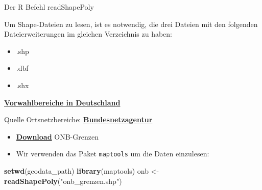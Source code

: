 \documentclass[ignorenonframetext,]{beamer}
\newenvironment{Shaded}{\begin{snugshade}}{\end{snugshade}}
\newcommand{\KeywordTok}[1]{\textcolor[rgb]{0.13,0.29,0.53}{\textbf{#1}}}
\newcommand{\NormalTok}[1]{#1}
\newcommand{\StringTok}[1]{\textcolor[rgb]{0.31,0.60,0.02}{#1}}
\providecommand{\tightlist}{%
  \setlength{\itemsep}{0pt}\setlength{\parskip}{0pt}}
\begin{document}
\begin{frame}{Der R Befehl readShapePoly}
\protect\hypertarget{der-r-befehl-readshapepoly}{}

Um Shape-Dateien zu lesen, ist es notwendig, die drei Dateien mit den
folgenden Dateierweiterungen im gleichen Verzeichnis zu haben:

\begin{itemize}
\tightlist
\item
  .shp
\item
  .dbf
\item
  .shx
\end{itemize}

\end{frame}

\begin{frame}[fragile]{\href{http://www.bundesnetzagentur.de/SharedDocs/Downloads/DE/Sachgebiete/Telekommunikation/Unternehmen_Institutionen/Nummerierung/Rufnummern/ONVerzeichnisse/ONBGrenzen/ONB_Grenzen.html}{\textbf{Vorwahlbereiche
in Deutschland}}}
\protect\hypertarget{vorwahlbereiche-in-deutschland}{}

\begin{block}{Quelle Ortsnetzbereiche:
\href{https://www.bundesnetzagentur.de/DE/Sachgebiete/Telekommunikation/Unternehmen_Institutionen/Nummerierung/Rufnummern/ONRufnr/ON_Einteilung_ONB/ON_ONB_ONKz_ONBGrenzen_Basepage.html}{\textbf{Bundesnetzagentur}}}

\begin{itemize}
\item
  \href{https://www.bundesnetzagentur.de/SharedDocs/Downloads/DE/Sachgebiete/Telekommunikation/Unternehmen_Institutionen/Nummerierung/Rufnummern/ONVerzeichnisse/ONBGrenzen/ONB-Grenzen-2018.zip?__blob=publicationFile\&v=21}{\textbf{Download}}
  ONB-Grenzen
\item
  Wir verwenden das Paket \texttt{maptools} um die Daten einzulesen:
\end{itemize}

\begin{Shaded}
\begin{Highlighting}[]
\KeywordTok{setwd}\NormalTok{(geodata_path)}
\KeywordTok{library}\NormalTok{(maptools)}
\NormalTok{onb <-}\StringTok{ }\KeywordTok{readShapePoly}\NormalTok{(}\StringTok{"onb_grenzen.shp"}\NormalTok{)}
\end{Highlighting}
\end{Shaded}

\end{block}

\end{frame}
\end{document}
